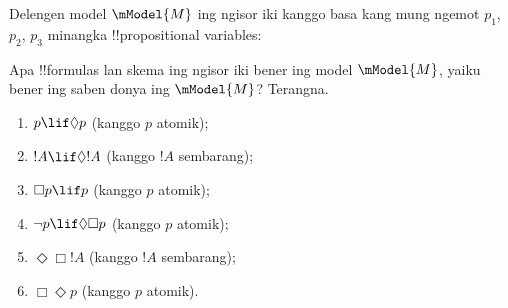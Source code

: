 \documentclass[../../../include/open-logic-section]{subfiles}
\begin{document}
\begin{prob}
  Delengen model $\mModel{M}$ ing ngisor iki kanggo basa
  kang mung ngemot $p_1$, $p_2$, $p_3$ minangka !!{propositional variable}s:
  \begin{center}
  \end{center}
  Apa !!{formula}s lan skema ing ngisor iki bener ing model $\mModel{M}$,
  yaiku bener ing saben donya ing $\mModel{M}$? Terangna.
  \begin{enumerate}
  \item $p\lif \Diamond p$ (kanggo $p$ atomik);
  \item $!A\lif \Diamond !A$ (kanggo $!A$ sembarang);
  \item $\Box p \lif p$ (kanggo $p$ atomik);
  \item $\lnot p \lif \Diamond \Box p$ (kanggo $p$ atomik);
  \item $\Diamond \Box !A$ (kanggo $!A$ sembarang);
  \item $\Box \Diamond p$ (kanggo $p$ atomik). 
  \end{enumerate}
\end{prob}
\end{document}
